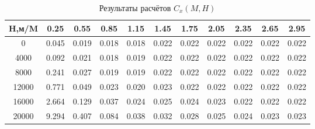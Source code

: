 \begin{table}[H]
\centering
\caption{Результаты расчётов $C_x(M,H)$}
\label{Cx}
\begin{tabular}{|c|c|c|c|c|c|c|c|c|c|c|}
\toprule
H,м/M &   0.25 &   0.55 &   0.85 &   1.15 &   1.45 &   1.75 &   2.05 &   2.35 &   2.65 &   2.95 \\
\midrule
0     &  0.045 &  0.019 &  0.018 &  0.018 &  0.022 &  0.022 &  0.022 &  0.022 &  0.022 &  0.022 \\
4000  &  0.092 &  0.021 &  0.018 &  0.019 &  0.022 &  0.022 &  0.022 &  0.022 &  0.022 &  0.022 \\
8000  &  0.241 &  0.027 &  0.019 &  0.019 &  0.022 &  0.022 &  0.022 &  0.022 &  0.022 &  0.022 \\
12000 &  0.771 &  0.049 &  0.023 &  0.020 &  0.023 &  0.022 &  0.022 &  0.022 &  0.022 &  0.022 \\
16000 &  2.664 &  0.129 &  0.037 &  0.024 &  0.025 &  0.024 &  0.023 &  0.022 &  0.022 &  0.022 \\
20000 &  9.294 &  0.407 &  0.084 &  0.038 &  0.032 &  0.028 &  0.025 &  0.024 &  0.023 &  0.023 \\
\bottomrule
\end{tabular}
\end{table}
